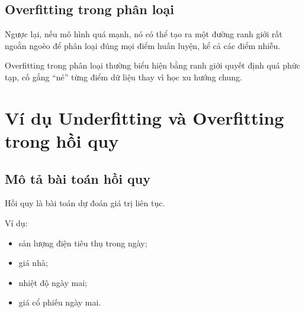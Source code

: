 \documentclass[12pt,a4paper]{report}
\begin{document}
\section{Overfitting trong phân loại}

Ngược lại, nếu mô hình quá mạnh, nó có thể tạo ra một đường ranh giới rất ngoằn ngoèo để phân loại đúng mọi điểm huấn luyện, kể cả các điểm nhiễu.

\begin{center}
\end{center}

\begin{ghinho}
Overfitting trong phân loại thường biểu hiện bằng ranh giới quyết định quá phức tạp, cố gắng ``né'' từng điểm dữ liệu thay vì học xu hướng chung.
\end{ghinho}

\chapter{Ví dụ Underfitting và Overfitting trong hồi quy}

\section{Mô tả bài toán hồi quy}

Hồi quy là bài toán dự đoán giá trị liên tục.

Ví dụ:

\begin{itemize}
    \item sản lượng điện tiêu thụ trong ngày;
    \item giá nhà;
    \item nhiệt độ ngày mai;
    \item giá cổ phiếu ngày mai.
\end{itemize}
\end{document}

